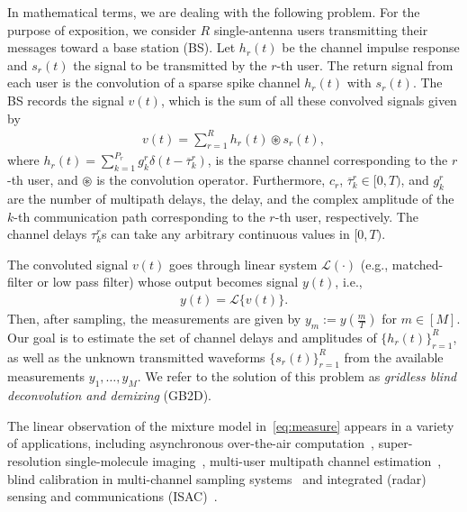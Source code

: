 \documentclass[conference,10pt]{IEEEtran}
\theoremstyle{remark}
\theoremstyle{plain}
\theoremstyle{definition}
\theoremstyle{remark}
\begin{document}
In mathematical terms, we are dealing with the following problem. For the purpose of exposition, we consider $R$ single-antenna users transmitting their messages toward a base station (BS). Let $h_r(t)$ be the channel impulse response and $s_r(t)$ the signal to be transmitted by the $r$-th user. The return signal from each user is the convolution of a sparse spike channel $h_r(t)$ with $s_r(t)$. The BS records the signal $v(t)$, which is the sum of all these convolved signals given by
\begin{align}\label{eq:mymodel}
     v(t)=\sum_{r=1}^{R}h_r(t)\circledast s_r(t),
\end{align}
where $h_r(t)=\sum_{k=1}^{P_r}g_k^r\delta(t-\overline{\tau}_k^r)$, is the sparse channel corresponding to the $r$-th user, and $\circledast$ is the convolution operator.
Furthermore, $c_r$, $\overline{\tau}_k^r\in [0, T)$, and $g_k^r$ are the number of multipath delays, the delay, and the complex amplitude of the $k$-th communication path corresponding to the $r$-th user, respectively. The channel delays $\tau_k^r$s can take any arbitrary continuous values in $[0, T)$. 
      
The convoluted signal $v(t)$ goes through linear system $\mathcal{L}(\cdot)$ (e.g., matched-filter or low pass filter) whose output becomes signal $y(t)$, i.e.,  
     \begin{align}\label{eq:measure}
     y(t) = \mathcal{L}\{v(t)\}. 
     \end{align}      
Then, after sampling, the measurements are given by $y_m := y(\frac{m}{T})$ for $m\in [M]$. Our goal is to estimate the set of channel delays and amplitudes of $\{h_r(t)\}_{r=1}^R$, as well as the unknown transmitted waveforms $\{s_r(t)\}_{r=1}^R$ from the available measurements  $y_1, \ldots, y_M$. We refer to the solution of this problem as \textit{gridless blind deconvolution and demixing} (GB2D). 

 
  The linear observation of the mixture model in~\eqref{eq:measure} appears in a variety of applications, including asynchronous over-the-air computation~\cite{SaeedBlind2022}, super-resolution single-molecule imaging~\cite{three-dimensionalsuper,SaeedBinary2020},  multi-user multipath channel estimation~\cite{jung2017blind,daei2023blind}, blind calibration in multi-channel sampling systems~\cite{vetterli2010multichannel,SayyariBlind2021} and integrated (radar) sensing and communications (ISAC)~\cite{liu2020joint}. 
  
\end{document}
